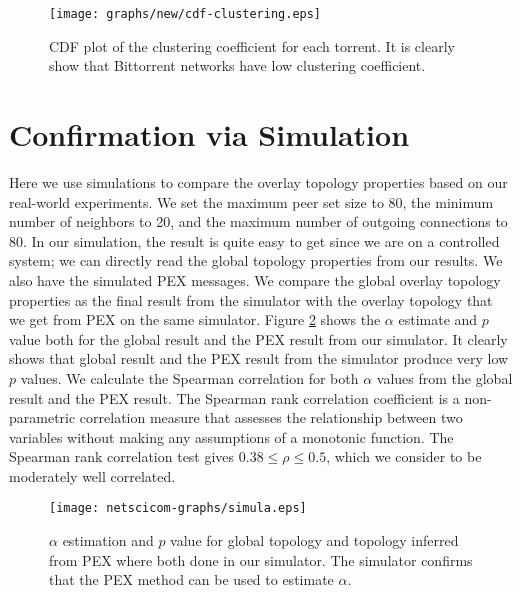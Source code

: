 \documentclass[paper]{ieice}
\begin{document}
\begin{figure}[tb]
\begin{center}
\texttt{[image: graphs/new/cdf-clustering.eps]}
\end{center}
\caption{CDF plot of the clustering coefficient for each torrent. It is clearly show that Bittorrent networks have low clustering coefficient.} 
\label{fig:cdf-clustering}
\end{figure}

\section{Confirmation via Simulation}\label{simulation}
Here we use simulations to compare the overlay topology properties based  on our real-world experiments. 
We set the maximum peer set size to 80, the minimum number of neighbors to 20, and the maximum number of outgoing connections to 80. 
In our simulation, the result is quite easy to get since we are on a controlled system;  we can directly read the  global topology properties from our results. 
We also have the simulated PEX messages. We compare the global overlay topology properties as the final result from the simulator with the overlay topology that we get from PEX on the same simulator.
Figure \ref{fig:simulation} shows the $\alpha$ estimate and $p$ value both for the global result and the PEX result from our simulator. 
It clearly shows that global result and the PEX result from the simulator produce very low $p$ values. 
We calculate the Spearman correlation for both $\alpha$ values from the global result and the PEX result. 
The Spearman rank correlation coefficient is a non-parametric correlation measure that assesses the relationship between two variables
without making any assumptions of a monotonic function.
The Spearman rank correlation test gives $0.38 \leq \rho \leq 0.5$, which we consider to be moderately well correlated. 

\begin{figure}[tb]
\begin{center}
\texttt{[image: netscicom-graphs/simula.eps]}
\end{center}
\caption{$\alpha$ estimation and $p$ value for global topology and topology inferred from PEX where both done in our simulator.
The simulator confirms that the PEX method can be used to estimate $\alpha$.} 
\label{fig:simulation}
\end{figure}
\end{document}
